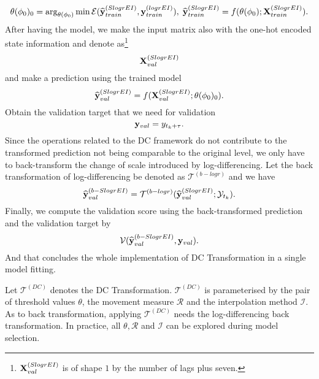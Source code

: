 \begin{equation*}
    \theta(\phi_0)_0 = \arg_{\theta(\phi_0)} \min \mathcal{E}(\widehat{\mathbf{y}}^{(SlogrEI)}_{train}, \mathbf{y}^{(logrEI)}_{train}), \; \widehat{\mathbf{y}}^{(SlogrEI)}_{train} = f(\theta(\phi_0); \mathbf{X}^{(SlogrEI)}_{train}).
\end{equation*}
After having the model, we make the input matrix also with the one-hot encoded state information and denote as\footnote{$\mathbf{X}^{(SlogrEI)}_{val}$ is of shape $1$ by the number of lags plus seven.}
\begin{equation*}
    \mathbf{X}^{(SlogrEI)}_{val}
\end{equation*}
and make a prediction using the trained model
\begin{equation*}
    \widehat{\mathbf{y}}^{(SlogrEI)}_{val} = f(\mathbf{X}^{(SlogrEI)}_{val} ; \theta(\phi_0)_0).
\end{equation*}
Obtain the validation target that we need for validation
\begin{equation*}
    \mathbf{y}_{val} = y_{t_k + \tau}.
\end{equation*}
Since the operations related to the DC framework do not contribute to the transformed prediction not being comparable to the original level, we only have to back-transform the change of scale introduced by log-differencing. Let the back transformation of log-differencing be denoted as $\mathcal{T}^{(b-logr)}$ and we have
\begin{equation*}
    \widehat{\mathbf{y}}^{(b-SlogrEI)}_{val} = \mathcal{T}^{(b-logr)} (\widehat{\mathbf{y}}^{(SlogrEI)}_{val} ; \mathcal{Y}_{t_k}).
\end{equation*}
Finally, we compute the validation score using the back-transformed prediction and the validation target by
\begin{equation*}
    \mathcal{V} (\widehat{\mathbf{y}}^{(b-SlogrEI)}_{val}, \mathbf{y}_{val}).
\end{equation*}
And that concludes the whole implementation of DC Transformation in a single model fitting.

Let $\mathcal{T}^{(DC)}$ denotes the DC Transformation. $\mathcal{T}^{(DC)}$ is parameterised by the pair of threshold values $\theta$, the movement measure $\mathcal{R}$ and the interpolation method $\mathcal{I}$. As to back transformation, applying $\mathcal{T}^{(DC)}$ needs the log-differencing back transformation. In practice, all $\theta, \mathcal{R}$ and $\mathcal{I}$ can be explored during model selection.

